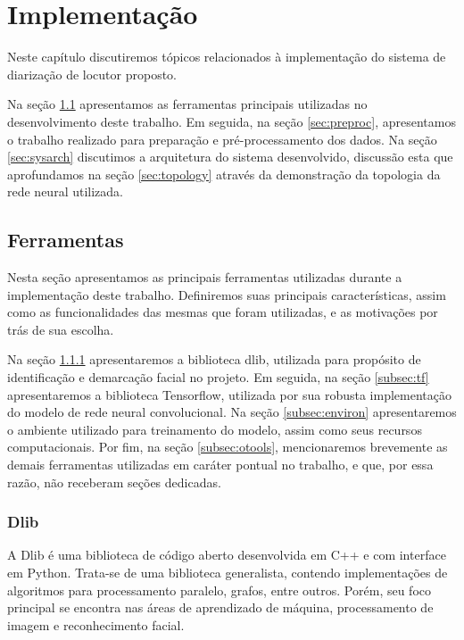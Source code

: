 \chapter{Implementação}
\label{chap:impl}

Neste capítulo discutiremos tópicos relacionados à implementação do sistema de diarização de locutor proposto. 

Na seção \ref{sec:tools} apresentamos as ferramentas principais utilizadas no desenvolvimento deste trabalho. Em seguida, na seção \ref{sec:preproc}, apresentamos o trabalho realizado para preparação e pré-processamento dos dados. Na seção \ref{sec:sysarch} discutimos a arquitetura do sistema desenvolvido, discussão esta que aprofundamos na seção \ref{sec:topology} através da demonstração da topologia da rede neural utilizada.

\section{Ferramentas}
\label{sec:tools}

Nesta seção apresentamos as principais ferramentas utilizadas durante a implementação deste trabalho. Definiremos suas principais características, assim como as funcionalidades das mesmas que foram utilizadas, e as motivações por trás de sua escolha.

Na seção \ref{subsec:dlib} apresentaremos a biblioteca dlib, utilizada para propósito de identificação e demarcação facial no projeto. Em seguida, na seção \ref{subsec:tf} apresentaremos a biblioteca Tensorflow, utilizada por sua robusta implementação do modelo de rede neural convolucional. Na seção \ref{subsec:environ} apresentaremos o ambiente utilizado para treinamento do modelo, assim como seus recursos computacionais. Por fim, na seção \ref{subsec:otools}, mencionaremos brevemente as demais ferramentas utilizadas em caráter pontual no trabalho, e que, por essa razão, não receberam seções dedicadas.

\subsection{Dlib}
\label{subsec:dlib}
A Dlib\cite{dlib09} é uma biblioteca de código aberto desenvolvida em C++ e com interface em Python. Trata-se de uma biblioteca generalista, contendo implementações de algoritmos para processamento paralelo, grafos, entre outros. Porém, seu foco principal se encontra nas áreas de aprendizado de máquina, processamento de imagem e reconhecimento facial.

